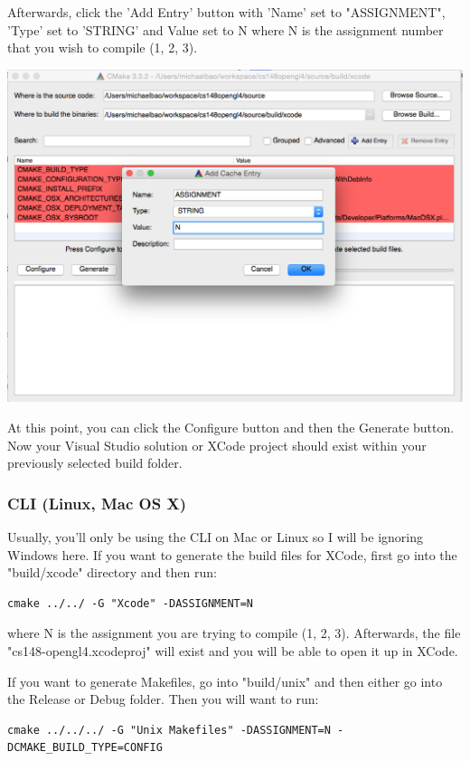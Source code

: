 \documentclass{article}
\begin{document}
Afterwards, click the 'Add Entry' button with 'Name' set to "ASSIGNMENT", 'Type' set to 'STRING' and Value set to N where N is the assignment number that you wish to compile (1, 2, 3).

\includegraphics[width=\linewidth]{cmake2.png}

At this point, you can click the Configure button and then the Generate button. Now your Visual Studio solution or XCode project should exist within your previously selected build folder.

\subsubsection*{CLI (Linux, Mac OS X)}

Usually, you'll only be using the CLI on Mac or Linux so I will be ignoring Windows here. If you want to generate the build files for XCode, first go into the "build/xcode" directory and then run: 

\begin{lstlisting}
cmake ../../ -G "Xcode" -DASSIGNMENT=N
\end{lstlisting}

where N is the assignment you are trying to compile (1, 2, 3). Afterwards, the file "cs148-opengl4.xcodeproj" will exist and you will be able to open it up in XCode.

If you want to generate Makefiles, go into "build/unix" and then either go into the Release or Debug folder. Then you will want to run:

\begin{lstlisting}
cmake ../../../ -G "Unix Makefiles" -DASSIGNMENT=N -DCMAKE_BUILD_TYPE=CONFIG
\end{lstlisting}
\end{document}
